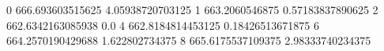 0 666.693603515625 4.05938720703125
1 663.2060546875 0.57183837890625
2 662.6342163085938 0.0
4 662.8184814453125 0.18426513671875
6 664.2570190429688 1.622802734375
8 665.6175537109375 2.98333740234375
